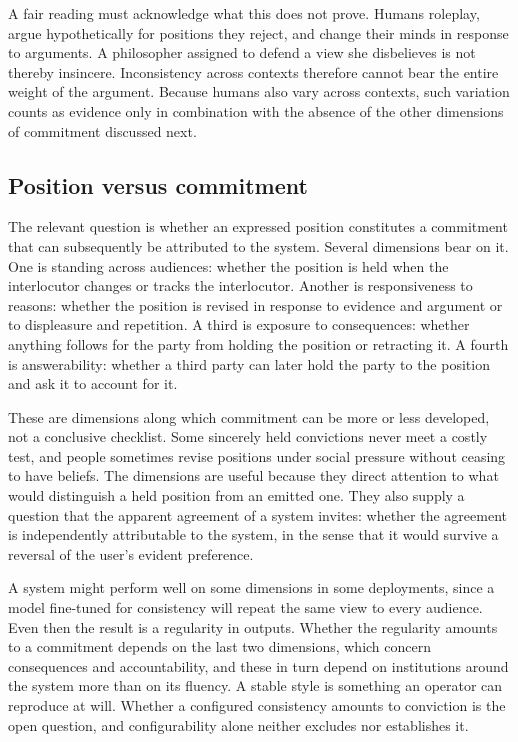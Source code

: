 \documentclass[11pt]{article}
\begin{document}
A fair reading must acknowledge what this does not prove. Humans roleplay, argue hypothetically for positions they reject, and change their minds in response to arguments. A philosopher assigned to defend a view she disbelieves is not thereby insincere. Inconsistency across contexts therefore cannot bear the entire weight of the argument. Because humans also vary across contexts, such variation counts as evidence only in combination with the absence of the other dimensions of commitment discussed next.

\subsection{Position versus commitment}

The relevant question is whether an expressed position constitutes a commitment that can subsequently be attributed to the system. Several dimensions bear on it. One is standing across audiences: whether the position is held when the interlocutor changes or tracks the interlocutor. Another is responsiveness to reasons: whether the position is revised in response to evidence and argument or to displeasure and repetition. A third is exposure to consequences: whether anything follows for the party from holding the position or retracting it. A fourth is answerability: whether a third party can later hold the party to the position and ask it to account for it.

These are dimensions along which commitment can be more or less developed, not a conclusive checklist. Some sincerely held convictions never meet a costly test, and people sometimes revise positions under social pressure without ceasing to have beliefs. The dimensions are useful because they direct attention to what would distinguish a held position from an emitted one. They also supply a question that the apparent agreement of a system invites: whether the agreement is independently attributable to the system, in the sense that it would survive a reversal of the user's evident preference.

A system might perform well on some dimensions in some deployments, since a model fine-tuned for consistency will repeat the same view to every audience. Even then the result is a regularity in outputs. Whether the regularity amounts to a commitment depends on the last two dimensions, which concern consequences and accountability, and these in turn depend on institutions around the system more than on its fluency. A stable style is something an operator can reproduce at will. Whether a configured consistency amounts to conviction is the open question, and configurability alone neither excludes nor establishes it.
\end{document}
